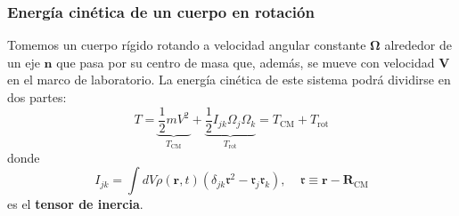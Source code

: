 \documentclass[]{article}
\numberwithin{equation}{section}
\begin{document}
\subsubsection{Energía cinética de un cuerpo en rotación}
Tomemos un cuerpo rígido rotando a velocidad angular constante \(\mathbf{\Omega}\) alrededor de un eje \(\mathbf{n}\) que pasa por su centro de masa que, además, se mueve con velocidad \(\mathbf{V}\) en el  marco de laboratorio. La energía cinética de este sistema podrá dividirse en dos partes:
\begin{equation}
	T = \underbrace{\frac{1}{2} m V^2}_{T_{\mathrm{CM}}} + \underbrace{\frac{1}{2} I_{jk} \Omega_{j} \Omega_{k}}_{T_{\mathrm{rot}}} = T_{\mathrm{CM}} + T_{\mathrm{rot}}
\end{equation}
donde
\begin{equation}
	I_{jk} = \int dV \rho(\textbf{r}, t) (\delta_{jk} \mathfrak{r}^2 - \mathfrak{r}_{j} \mathfrak{r}_{k}), ~~~~~ \mathfrak{r} \equiv \mathbf{r} - \mathbf{R}_{\mathrm{CM}}
\end{equation}
es el \textbf{tensor de inercia}.
\end{document}
